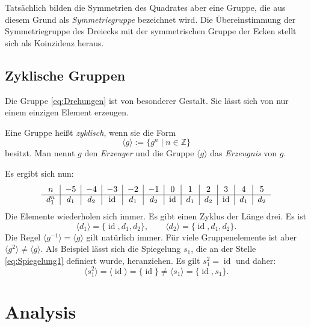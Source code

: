 \documentclass[a4paper,11pt,fleqn,twoside]{scrartcl}
\numberwithin{equation}{section}
\newcommand{\Z}{\mathbb Z}
\newcommand{\id}{\operatorname{id}}
\newcommand{\strong}[1]{{\sf\bfseries #1}}
\newenvironment{Definition}{\strong{Definition.}}{\par}
\begin{document}
Tatsächlich bilden die Symmetrien des Quadrates aber eine Gruppe,
die aus diesem Grund als \emph{Symmetriegruppe} bezeichnet wird.
Die Übereinstimmung der Symmetriegruppe des Dreiecks mit der
symmetrischen Gruppe der Ecken stellt sich als Koinzidenz heraus.

\subsection{Zyklische Gruppen}
Die Gruppe \eqref{eq:Drehungen} ist von besonderer Gestalt.
Sie lässt sich von nur einem einzigen Element erzeugen.

\begin{Definition}
Eine Gruppe heißt \emph{zyklisch}, wenn sie die Form
\begin{equation}
\langle g\rangle := \{g^n\mid n\in\Z\}
\end{equation}
besitzt. Man nennt $g$ den \emph{Erzeuger}
und die Gruppe $\langle g\rangle$ das \emph{Erzeugnis} von $g$.
\end{Definition}
Es ergibt sich nun:
\begin{equation}
\begin{tabular}{c|c|c|c|c|c|c|c|c|c|c|c}
$n$ & $-5$ & $-4$ & $-3$ & $-2$ & $-1$
& $0$ & $1$ & $2$ & $3$ & $4$ & $5$\\
\hline
$d_1^n$ & $d_1$ & $d_2$ & $\id$ & $d_1$ & $d_2$
& $\id$ & $d_1$ & $d_2$ & $\id$ & $d_1$ & $d_2$
\end{tabular}
\end{equation}
Die Elemente wiederholen sich immer. Es gibt einen Zyklus
der Länge drei. Es ist
\begin{equation}
\langle d_1\rangle = \{\id,d_1,d_2\},\qquad\langle d_2\rangle = \{\id,d_1,d_2\}.
\end{equation}
Die Regel $\langle g^{-1}\rangle = \langle g\rangle$ gilt natürlich
immer. Für viele Gruppenelemente ist aber
$\langle g^2\rangle\ne \langle g\rangle$. Als Beispiel lässt sich die
Spiegelung $s_1$, die an der Stelle \eqref{eq:Spiegelung1} definiert
wurde, heranziehen. Es gilt $s_1^2=\id$ und daher:
\begin{equation}
\langle s_1^2\rangle = \langle\id\rangle
= \{\id\} \ne \langle s_1\rangle = \{\id,s_1\}.
\end{equation}

\section{Analysis}
\end{document}
